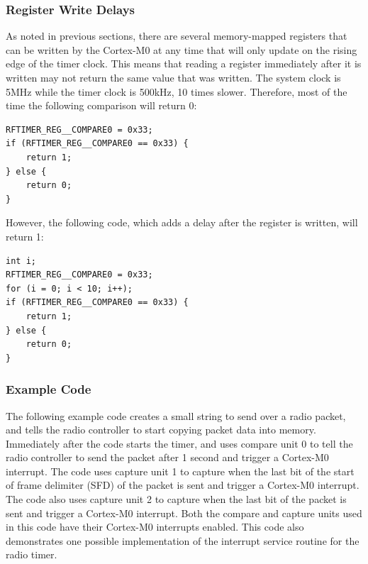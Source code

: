 \subsubsection{Register Write Delays}
As noted in previous sections, there are several memory-mapped registers that can be written by the Cortex-M0 at any time that will only update on the rising edge of the timer clock. This means that reading a register immediately after it is written may not return the same value that was written. The system clock is 5MHz while the timer clock is 500kHz, 10 times slower. Therefore, most of the time the following comparison will return 0:

\begin{lstlisting}
RFTIMER_REG__COMPARE0 = 0x33;
if (RFTIMER_REG__COMPARE0 == 0x33) {
    return 1;
} else {
    return 0;
}
\end{lstlisting}

However, the following code, which adds a delay after the register is written, will return 1:

\begin{lstlisting}
int i;
RFTIMER_REG__COMPARE0 = 0x33;
for (i = 0; i < 10; i++);
if (RFTIMER_REG__COMPARE0 == 0x33) {
    return 1;
} else {
    return 0;
}
\end{lstlisting}

\subsubsection{Example Code}
The following example code creates a small string to send over a radio packet, and tells the radio controller to start copying packet data into memory. Immediately after the code starts the timer, and uses compare unit 0 to tell the radio controller to send the packet after 1 second and trigger a Cortex-M0 interrupt. The code uses capture unit 1 to capture when the last bit of the start of frame delimiter (SFD) of the packet is sent and trigger a Cortex-M0 interrupt. The code also uses capture unit 2 to capture when the last bit of the packet is sent and trigger a Cortex-M0 interrupt. Both the compare and capture units used in this code have their Cortex-M0 interrupts enabled. This code also demonstrates one possible implementation of the interrupt service routine for the radio timer.

